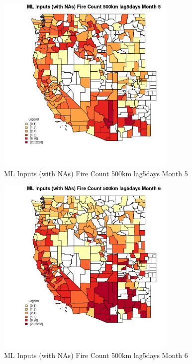 \clearpage 

\begin{figure} 
\centering  
\includegraphics[width=0.77\textwidth]{Code_Outputs/Report_ML_input_PM25_Step4_part_e_de_duplicated_aves_compiled_2019-05-20wNAs_CountyFire_Count_500km_lag5daysmedianMonth5.jpg} 
\caption{\label{fig:Report_ML_input_PM25_Step4_part_e_de_duplicated_aves_compiled_2019-05-20wNAsCountyFire_Count_500km_lag5daysmedianMonth5}ML Inputs (with NAs) Fire Count 500km lag5days Month 5} 
\end{figure} 
 

\begin{figure} 
\centering  
\includegraphics[width=0.77\textwidth]{Code_Outputs/Report_ML_input_PM25_Step4_part_e_de_duplicated_aves_compiled_2019-05-20wNAs_CountyFire_Count_500km_lag5daysmedianMonth6.jpg} 
\caption{\label{fig:Report_ML_input_PM25_Step4_part_e_de_duplicated_aves_compiled_2019-05-20wNAsCountyFire_Count_500km_lag5daysmedianMonth6}ML Inputs (with NAs) Fire Count 500km lag5days Month 6} 
\end{figure} 
 

